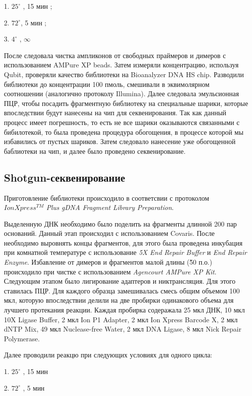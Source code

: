 1.	$25^{\circ}$ , 15 мин ;

2.	$72^{\circ}$, 5 мин ;

3.  $4^{\circ}$ ,  $\infty$

После следовала чистка ампликонов от свободных праймеров и димеров с использованием AMPure XP beads. Затем измеряли концентрацию, используя Qubit, проверяли качество библиотеки на Bioanalyzer DNA HS chip. Разводили библиотеки до концентрации 100 пмоль, смешивали в эквимолярном соотношении (аналогично протоколу Illumina). Далее следовала эмульсионная ПЦР, чтобы посадить фрагментную библиотеку на специальные шарики, которые впоследствии будут нанесены на чип для секвенирования. Так как данный процесс имеет погрешность, то есть не все шарики оказываются связанными с бибилотекой, то была проведена процедура обогощения, в процессе которой мы избавились от пустых шариков. Затем следовало нанесение уже обогощенной баблиотеки на чип, и далее было проведено секвенирование.




\subsection{Shotgun-секвенирование}  \label{subsect1_2_4}
Приготовление библиотеки происходило в соответсвии с протоколом $IonXpress^{TM}$ \textit{Plus gDNA Fragment Library Preparation}.

Выделенную ДНК необходимо было поделить на фрагменты длинной 200 пар оснований. Данный этап происходил с использованием Covaris. После необходимо выровнять концы фрагментов, для этого была проведена инкубация при комнатной температуре с использование  \textit{5X End Repair Buffer} и  \textit{End Repair Enzyme}. Избавление от димеров и фрагментов малой длины (\~50 п.о.) происходило при чистке с использованием \textit{Agencourt AMPure XP Kit}. Следующим этапом было лигирование адаптеров и никтрансляция. Для этого ставилась ПЦР. Для каждого образца замешивалась смесь общим объемом 100 мкл, которую впоследствии делили на две пробирки одинакового объема для лучшего протекания реакции. Каждая пробирка содеражала 25 мкл ДНК, 10 мкл 10X Ligase Buffer, 2 мкл Ion P1 Adapter, 2 мкл Ion Xpress Barcode X, 2 мкл dNTP Mix, 49 мкл Nuclease-free Water, 2 мкл DNA Ligase, 8 мкл Nick Repair Polymerase. 

Далее проводили реакцю при следующих условиях для одного цикла:

1.	$25^{\circ}$ , 15 мин 

2.	$72^{\circ}$ , 5 мин

